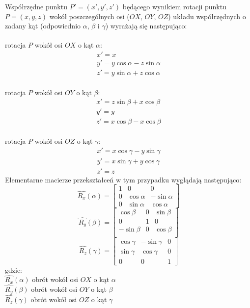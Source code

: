 \documentclass[licencjacka]{pracamgr}
\begin{document}
Współrzędne punktu $P'=(x',y',z')$ będącego wynikiem rotacji punktu $P=(x,y,z)$ wokół poszczególnych osi ($OX$, $OY$, $OZ$) układu współrzędnych o zadany kąt (odpowiednio $\alpha$, $\beta$ i $\gamma$) wyrażają się następująco:
\\
\\
rotacja $P$ wokół osi $OX$ o kąt $\alpha$:
$$
\begin{array}{lr}
x'=x \\
y'=y\cos{\alpha}-z\sin{\alpha} \\
z'=y\sin{\alpha}+z\cos{\alpha}
\end{array}
$$
\\
rotacja $P$ wokół osi $OY$ o kąt $\beta$:
$$
\begin{array}{lr}
x'=z\sin{\beta}+x\cos{\beta} \\
y'=y \\
z'=x\cos{\beta}-x\cos{\beta}
\end{array}
$$
\\
rotacja $P$ wokół osi $OZ$ o kąt $\gamma$:
$$
\begin{array}{lr}
x'=x\cos{\gamma}-y\sin{\gamma} \\
y'=x\sin{\gamma}+y\cos{\gamma} \\
z'=z
\end{array}
$$
Elementarne macierze przekształceń w tym przypadku wyglądają następująco:
$$
\hat{R_x}(\alpha)
=
\begin{bmatrix}
1 & 0 & 0 \\
0 & \cos{\alpha} & -\sin{\alpha} \\
0 & \sin{\alpha} & \cos{\alpha}
\end{bmatrix}
$$
$$
\hat{R_y}(\beta)
=
\begin{bmatrix}
\cos{\beta} & 0 & \sin{\beta} \\
0 & 1 & 0 \\
-\sin{\beta} & 0 & \cos{\beta} \\
\end{bmatrix}
$$
$$
\hat{R_z}(\gamma)
=
\begin{bmatrix}
\cos{\gamma} & -\sin{\gamma} & 0 \\
\sin{\gamma} & \cos{\gamma} & 0 \\
0 & 0 & 1
\end{bmatrix}
$$
gdzie:
\\
$\hat{R_x}(\alpha)$ obrót wokół osi $OX$ o kąt $\alpha$
\\
$\hat{R_y}(\beta)$ obrót wokół osi $OY$ o kąt $\beta$
\\
$\hat{R_z}(\gamma)$ obrót wokół osi $OZ$ o kąt $\gamma$
\end{document}
